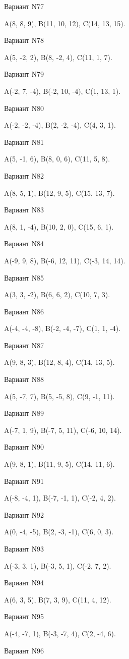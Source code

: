 \documentclass[11pt]{report}
\begin{document}
Вариант N77

A(8, 8, 9), B(11, 10, 12), C(14, 13, 15).

Вариант N78

A(5, -2, 2), B(8, -2, 4), C(11, 1, 7).

Вариант N79

A(-2, 7, -4), B(-2, 10, -4), C(1, 13, 1).

Вариант N80

A(-2, -2, -4), B(2, -2, -4), C(4, 3, 1).

Вариант N81

A(5, -1, 6), B(8, 0, 6), C(11, 5, 8).

Вариант N82

A(8, 5, 1), B(12, 9, 5), C(15, 13, 7).

Вариант N83

A(8, 1, -4), B(10, 2, 0), C(15, 6, 1).

Вариант N84

A(-9, 9, 8), B(-6, 12, 11), C(-3, 14, 14).

Вариант N85

A(3, 3, -2), B(6, 6, 2), C(10, 7, 3).

Вариант N86

A(-4, -4, -8), B(-2, -4, -7), C(1, 1, -4).

Вариант N87

A(9, 8, 3), B(12, 8, 4), C(14, 13, 5).

Вариант N88

A(5, -7, 7), B(5, -5, 8), C(9, -1, 11).

Вариант N89

A(-7, 1, 9), B(-7, 5, 11), C(-6, 10, 14).

Вариант N90

A(9, 8, 1), B(11, 9, 5), C(14, 11, 6).

Вариант N91

A(-8, -4, 1), B(-7, -1, 1), C(-2, 4, 2).

Вариант N92

A(0, -4, -5), B(2, -3, -1), C(6, 0, 3).

Вариант N93

A(-3, 3, 1), B(-3, 5, 1), C(-2, 7, 2).

Вариант N94

A(6, 3, 5), B(7, 3, 9), C(11, 4, 12).

Вариант N95

A(-4, -7, 1), B(-3, -7, 4), C(2, -4, 6).

Вариант N96
\end{document}
